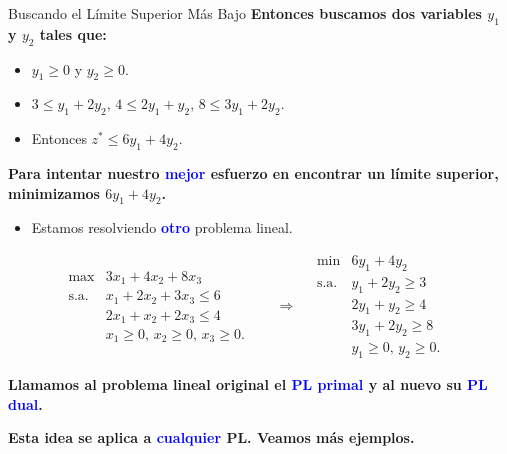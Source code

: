 \documentclass{beamer}
\begin{document}
\begin{frame}{Buscando el Límite Superior Más Bajo}
    \textbf{Entonces buscamos dos variables \( y_1 \) y \( y_2 \) tales que:}
    \begin{itemize}
        \item \( y_1 \geq 0 \) y \( y_2 \geq 0 \).
        \item \( 3 \leq y_1 + 2y_2, \, 4 \leq 2y_1 + y_2, \, 8 \leq 3y_1 + 2y_2 \).
        \item Entonces \( z^* \leq 6y_1 + 4y_2 \).
    \end{itemize}

    \vspace{0.3cm}
    \textbf{Para intentar nuestro \textcolor{blue}{mejor} esfuerzo en encontrar un límite superior, minimizamos \( 6y_1 + 4y_2 \).}
    \begin{itemize}
        \item Estamos resolviendo \textbf{\textcolor{blue}{otro}} problema lineal.
    \end{itemize}

    \vspace{0.3cm}
    \[
    \begin{array}{lll}
    \text{max} & 3x_1 + 4x_2 + 8x_3 & \\
    \text{s.a.} & x_1 + 2x_2 + 3x_3 \leq 6 & \\
    & 2x_1 + x_2 + 2x_3 \leq 4 & \\
    & x_1 \geq 0, \, x_2 \geq 0, \, x_3 \geq 0. &
    \end{array}
    \quad \Rightarrow \quad
    \begin{array}{lll}
    \text{min} & 6y_1 + 4y_2 & \\
    \text{s.a.} & y_1 + 2y_2 \geq 3 & \\
    & 2y_1 + y_2 \geq 4 & \\
    & 3y_1 + 2y_2 \geq 8 & \\
    & y_1 \geq 0, \, y_2 \geq 0. &
    \end{array}
    \]

    \vspace{0.3cm}
    \textbf{Llamamos al problema lineal original el \textcolor{blue}{PL primal} y al nuevo su \textcolor{blue}{PL dual}.}

    \vspace{0.3cm}
    \textbf{Esta idea se aplica a \textcolor{blue}{cualquier} PL. Veamos más ejemplos.}
\end{frame}
\end{document}
